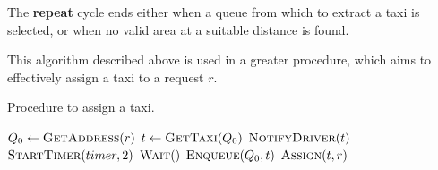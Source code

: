 The \textbf{repeat} cycle ends either when a queue from which to extract a taxi is selected, or when no valid area at a suitable distance is found.


This algorithm described above is used in a greater procedure, which aims to effectively assign a taxi to a request $r$.
\begin{algorithm}
\caption{Procedure to assign a taxi.} \label{alg:assignTaxi}
\begin{algorithmic}[1]
	\State $Q_0 \gets \Call{GetAddress}{r}$
	\Repeat
		\State $t \gets \Call{\GetTaxi}{Q_0}$
		\State $\Call{NotifyDriver}{t}$
		\State $\Call{StartTimer}{timer,2}$ 
			\State $\Call{Wait}{\nullfont}$
		\EndWhile 
			\State $\Call{Enqueue}{Q_0,t}$
		\EndIf
	\State $\Call{Assign}{t,r}$
\EndProcedure
\end{algorithmic}
\end{algorithm}

















